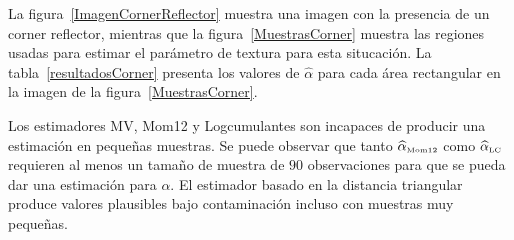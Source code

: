 
La figura~\ref{ImagenCornerReflector} muestra una imagen con la presencia de un corner reflector, mientras que la figura~\ref{MuestrasCorner} muestra las regiones usadas para estimar el parámetro de textura para esta situcación. La tabla~\ref{resultadosCorner} presenta los valores de  $\widehat{\alpha}$ para cada área rectangular en la imagen de la figura~\ref{MuestrasCorner}.

Los estimadores MV, Mom12 y  Logcumulantes son incapaces de producir una estimación en pequeñas muestras.  Se puede observar que tanto $\widehat\alpha_{\text{\tiny{Mom12}}}$ como $\widehat\alpha_{\text{\tiny{LC}}}$ requieren al menos un tamaño de muestra de $90$ observaciones para que se pueda dar una estimación para $\alpha$. El estimador basado en la distancia triangular produce valores plausibles bajo contaminación incluso con muestras muy pequeñas.

